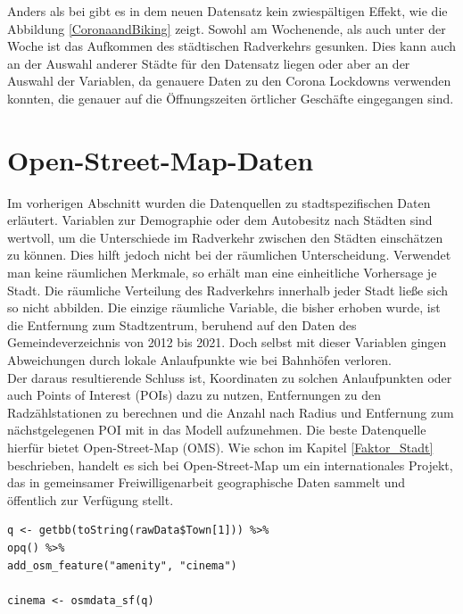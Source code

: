\documentclass[a4paper,12pt]{thesis}
\begin{document}
Anders als bei \cite{Moellers2021} gibt es in dem neuen Datensatz kein zwiespältigen Effekt, wie die Abbildung \ref{CoronaandBiking} zeigt. Sowohl am Wochenende, als auch unter der Woche ist das Aufkommen des städtischen Radverkehrs gesunken. Dies kann auch an der Auswahl anderer Städte für den Datensatz liegen oder aber an der Auswahl der Variablen, da \cite{Moellers2021} genauere Daten zu den Corona Lockdowns verwenden konnten, die genauer auf die Öffnungszeiten örtlicher Geschäfte eingegangen sind.

\section{Open-Street-Map-Daten}\label{OMSDATA}

Im vorherigen Abschnitt wurden die Datenquellen zu stadtspezifischen Daten erläutert. Variablen zur Demographie oder dem Autobesitz nach Städten sind wertvoll, um die Unterschiede im Radverkehr zwischen den Städten einschätzen zu können. Dies hilft jedoch nicht bei der räumlichen Unterscheidung. Verwendet man keine räumlichen Merkmale, so erhält man eine einheitliche Vorhersage je Stadt. Die räumliche Verteilung des Radverkehrs innerhalb jeder Stadt ließe sich so nicht abbilden. Die einzige räumliche Variable, die bisher erhoben wurde, ist die Entfernung zum Stadtzentrum, beruhend auf den Daten des Gemeindeverzeichnis von 2012 bis 2021. Doch selbst mit dieser Variablen gingen Abweichungen durch lokale Anlaufpunkte wie bei Bahnhöfen verloren.\\
Der daraus resultierende Schluss ist, Koordinaten zu solchen Anlaufpunkten oder auch Points of Interest (POIs) dazu zu nutzen, Entfernungen zu den Radzählstationen zu berechnen und die Anzahl nach Radius und Entfernung zum nächstgelegenen POI mit in das Modell aufzunehmen. Die beste Datenquelle hierfür bietet Open-Street-Map (OMS). Wie schon im Kapitel \ref{Faktor_Stadt} beschrieben, handelt es sich bei Open-Street-Map um ein internationales Projekt, das in gemeinsamer Freiwilligenarbeit geographische Daten sammelt und öffentlich zur Verfügung stellt.\\

\begin{lstlisting}[caption={OSM Daten Abfrage},label=code:osmdata_query]
q <- getbb(toString(rawData$Town[1])) %>%
opq() %>%
add_osm_feature("amenity", "cinema")
	
cinema <- osmdata_sf(q)
\end{lstlisting}
\end{document}
